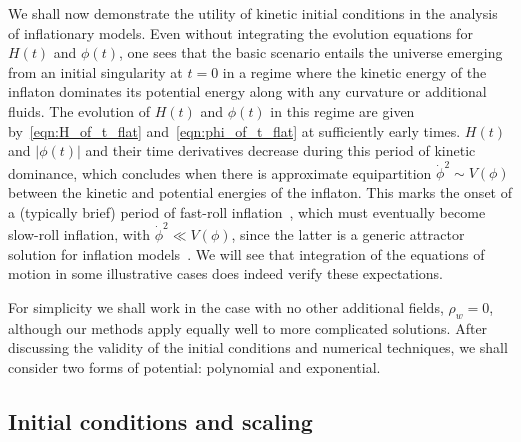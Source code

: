 We shall now demonstrate the utility of kinetic initial conditions in the analysis of inflationary models. Even without integrating the evolution equations for \(H(t)\) and \(\phi(t)\), one sees that the basic scenario entails the universe emerging from an initial singularity at \(t=0\) in a regime where the kinetic energy of the inflaton dominates its potential energy along with any curvature or additional fluids.  The evolution of \(H(t)\) and \(\phi(t)\) in this regime are given by~\eqref{eqn:H_of_t_flat} and~\eqref{eqn:phi_of_t_flat} at sufficiently early times.  \(H(t)\) and \(|\phi(t)|\) and their time derivatives decrease during this period of kinetic dominance, which concludes when there is approximate equipartition \(\dot{\phi}^2 \sim V(\phi)\) between the kinetic and potential energies of the inflaton.  This marks the onset of a (typically brief) period of fast-roll inflation~\citep{Linde:2001}, which must eventually become slow-roll inflation, with \(\dot{\phi}^2 \ll V(\phi)\), since the latter is a generic attractor solution for inflation models~\citep{belinsky_inflationary_1985}.  We will see that integration of the equations of motion in some illustrative cases does indeed verify these expectations.

For simplicity we shall work in the case with no other additional fields, \(\rho_w=0\), although our methods apply equally well to more complicated solutions. After discussing the validity of the initial conditions and numerical techniques, we shall consider two forms of potential: polynomial and exponential.

\subsection{Initial conditions and scaling}

